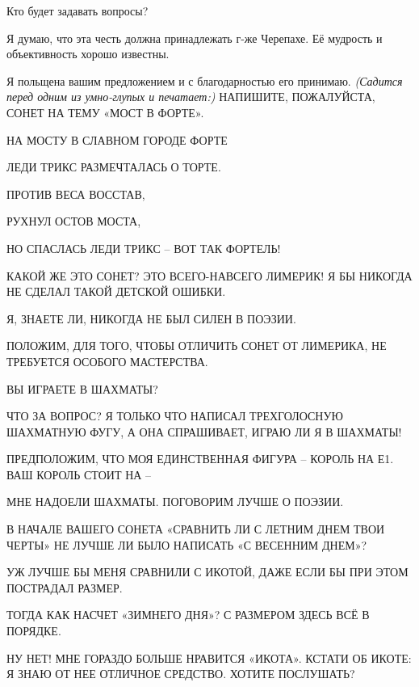 \documentclass[../main.tex]{subfiles}
\begin{document}
\begin{dialogue}

 Кто будет задавать вопросы?

 Я думаю, что эта честь должна принадлежать г-же Черепахе. Её мудрость и объективность хорошо известны.

 Я польщена вашим предложением и с благодарностью его принимаю. \emph{(Садится перед одним из умно-глупых и печатает:)} НАПИШИТЕ, ПОЖАЛУЙСТА, СОНЕТ НА ТЕМУ «МОСТ В ФОРТЕ».


 НА МОСТУ В СЛАВНОМ ГОРОДЕ ФОРТЕ

ЛЕДИ ТРИКС РАЗМЕЧТАЛАСЬ О ТОРТЕ.

ПРОТИВ ВЕСА ВОССТАВ,

РУХНУЛ ОСТОВ МОСТА,

НО СПАСЛАСЬ ЛЕДИ ТРИКС \--- ВОТ ТАК ФОРТЕЛЬ!

 КАКОЙ ЖЕ ЭТО СОНЕТ? ЭТО ВСЕГО-НАВСЕГО ЛИМЕРИК! Я БЫ НИКОГДА НЕ СДЕЛАЛ ТАКОЙ ДЕТСКОЙ ОШИБКИ.

 Я, ЗНАЕТЕ ЛИ, НИКОГДА НЕ БЫЛ СИЛЕН В ПОЭЗИИ.

 ПОЛОЖИМ, ДЛЯ ТОГО, ЧТОБЫ ОТЛИЧИТЬ СОНЕТ ОТ ЛИМЕРИКА, НЕ ТРЕБУЕТСЯ ОСОБОГО МАСТЕРСТВА.

 ВЫ ИГРАЕТЕ В ШАХМАТЫ?

 ЧТО ЗА ВОПРОС? Я ТОЛЬКО ЧТО НАПИСАЛ ТРЕХГОЛОСНУЮ ШАХМАТНУЮ ФУГУ, А ОНА СПРАШИВАЕТ, ИГРАЮ ЛИ Я В ШАХМАТЫ!

 ПРЕДПОЛОЖИМ, ЧТО МОЯ ЕДИНСТВЕННАЯ ФИГУРА \--- КОРОЛЬ НА Е1. ВАШ КОРОЛЬ СТОИТ НА \---

 МНЕ НАДОЕЛИ ШАХМАТЫ. ПОГОВОРИМ ЛУЧШЕ О ПОЭЗИИ.

 В НАЧАЛЕ ВАШЕГО СОНЕТА «СРАВНИТЬ ЛИ С ЛЕТНИМ ДНЕМ ТВОИ ЧЕРТЫ» НЕ ЛУЧШЕ ЛИ БЫЛО НАПИСАТЬ «С ВЕСЕННИМ ДНЕМ»?

 УЖ ЛУЧШЕ БЫ МЕНЯ СРАВНИЛИ С ИКОТОЙ, ДАЖЕ ЕСЛИ БЫ ПРИ ЭТОМ ПОСТРАДАЛ РАЗМЕР.

 ТОГДА КАК НАСЧЕТ «ЗИМНЕГО ДНЯ»? С РАЗМЕРОМ ЗДЕСЬ ВСЁ В ПОРЯДКЕ.

 НУ НЕТ! МНЕ ГОРАЗДО БОЛЬШЕ НРАВИТСЯ «ИКОТА». КСТАТИ ОБ ИКОТЕ: Я ЗНАЮ ОТ НЕЕ ОТЛИЧНОЕ СРЕДСТВО. ХОТИТЕ ПОСЛУШАТЬ?


\end{dialogue}
\end{document}
